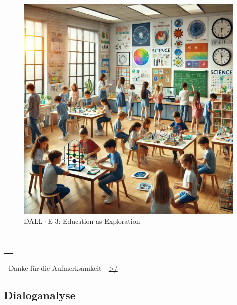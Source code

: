 \documentclass[
  letterpaper,
  DIV=11,
  numbers=noendperiod]{scrartcl}
\begin{document}
\begin{figure}[H]

{\centering \includegraphics[width=1\textwidth,height=\textheight]{images/explorer_education1.webp}

}

\caption{DALL·E 3: Education as Exploration}

\end{figure}%

\subsection{\_}\label{please_vote_id}

\emph{-} Danke für die Aufmerksamkeit \emph{-}
\href{https://wolfgangspahn.github.io/intro-IS2-KI-research.github.io}{\textgreater/}

\subsection{Dialoganalyse}\label{dialoganalyse}
\end{document}
